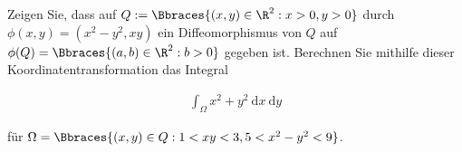 
\begin{exercise}

Zeigen Sie, dass auf $Q := \Bbraces{(x, y) \in \R^2: x > 0, y > 0}$ durch $\phi(x, y) = (x^2 - y^2, x y)$ ein Diffeomorphismus von $Q$ auf $\phi(Q) = \Bbraces{(a, b) \in \R^2: b > 0}$ gegeben ist.
Berechnen Sie mithilfe dieser Koordinatentransformation das Integral

\begin{align*}
    \int_\Omega
    x^2 + y^2
    ~\mathrm{d} x ~\mathrm{d} y
\end{align*}

für $\Omega = \Bbraces{(x, y) \in Q: 1 < x y < 3, 5 < x^2 - y^2 < 9}$.

\end{exercise}


